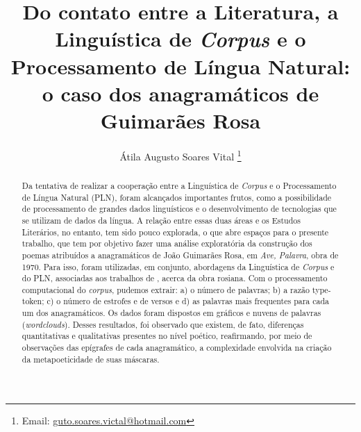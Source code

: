 \documentclass[portuguese]{textolivre}
\title{Do contato entre a Literatura, a Linguística de \textit{Corpus} e o Processamento de Língua Natural: o caso dos anagramáticos de Guimarães Rosa}
\author[1]{Átila Augusto Soares Vital \orcid{0000-0001-9875-4799}\thanks{Email: \href{mailto:guto.soares.victal@hotmail.com}{guto.soares.victal@hotmail.com}}}
\affil[1]{Universidade Federal de Minas Gerais, Faculdade de Letras, Belo Horizonte, MG, Brasil.}
\begin{document}
\maketitle

\begin{polyabstract}
\begin{abstract}
Da tentativa de realizar a cooperação entre a Linguística de \textit{Corpus} e o Processamento de Língua Natural (PLN), foram alcançados importantes frutos, como a possibilidade de processamento de grandes dados linguísticos e o desenvolvimento de tecnologias que se utilizam de dados da língua. A relação entre essas duas áreas e os Estudos Literários, no entanto, tem sido pouco explorada, o que abre espaços para o presente trabalho, que tem por objetivo fazer uma análise exploratória da construção dos poemas atribuídos a anagramáticos de João Guimarães Rosa, em \textit{Ave, Palavra}, obra de 1970. Para isso, foram utilizadas, em conjunto, abordagens da Linguística de \textit{Corpus} e do PLN, associadas aos trabalhos de \textcite{rossi_as_2007,brito_aspectos_2012,vital_uma_2021}, acerca da obra rosiana. Com o processamento computacional do \textit{corpus}, pudemos extrair: a) o número de palavras; b) a razão type-token; c) o número de estrofes e de versos e d) as palavras mais frequentes para cada um dos anagramáticos. Os dados foram dispostos em gráficos e nuvens de palavras (\textit{wordclouds}). Desses resultados, foi observado que existem, de fato, diferenças quantitativas e qualitativas presentes no nível poético, reafirmando, por meio de observações das epígrafes de cada anagramático, a complexidade envolvida na criação da metapoeticidade de suas máscaras.

\end{abstract}


\end{polyabstract}
\end{document}
